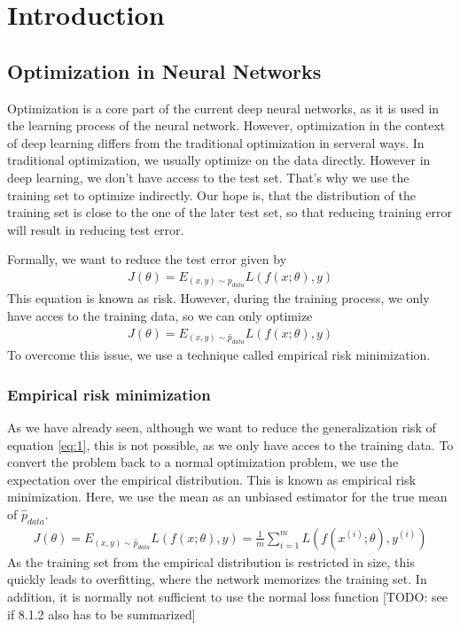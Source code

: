 \chapter{Introduction}
\section{Optimization in Neural Networks}
Optimization is a core part of the current deep neural networks, as it is used
in the learning process of the neural network. However, optimization in the
context of deep learning differs from the traditional optimization in serveral
ways. In traditional optimization, we usually optimize on the data directly.
However in deep learning, we don't have access to the test set. That's why we
use the training set to optimize indirectly. Our hope is, that the distribution
of the training set is close to the one of the later test set, so that reducing
training error will result in reducing test error.

Formally, we want to reduce the test error given by
\begin{align}\label{eq:1}
    J(\theta) = E_{(x,y)\sim p_{data}} L(f(x;\theta), y)
\end{align}
This equation is known as risk.
However, during the training process, we only have acces to the training data,
so we can only optimize
\begin{align}
    J(\theta) = E_{(x,y)\sim \hat{p}_{data}} L(f(x;\theta), y)
\end{align}
To overcome this issue, we use a technique called empirical risk minimization.

\subsection{Empirical risk minimization}\label{sub:1}
As we have already seen, although we want to reduce the generalization risk of
equation \ref{eq:1}, this is not possible, as we only have acces to the training data.
To convert the problem back to a normal optimization problem, we use the
expectation over the empirical distribution. This is known as empirical risk
minimization. Here, we use the mean as an unbiased estimator for the true mean
of $\hat{p}_{data}$.
\begin{align}\label{eq:3}
    J(\theta) = E_{(x,y)\sim \hat{p}_{data}} L(f(x;\theta), y) = \frac{1}{m} \sum_{i=1}^m L(f(x^{(i)}; \theta), y^{(i)})
\end{align}
As the training set from the empirical distribution is restricted in size, this
quickly leads to overfitting, where the network memorizes the training set. In
addition, it is normally not sufficient to use the normal loss function [TODO:
see if 8.1.2 also has to be summarized]

